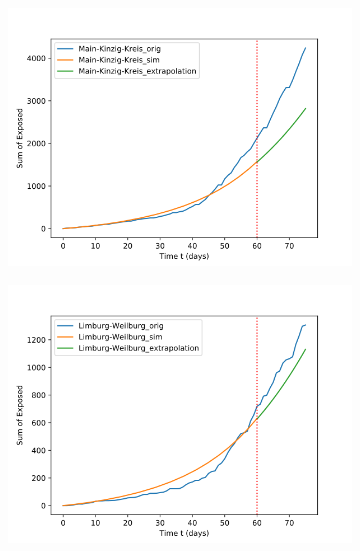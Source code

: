 \begin{figure}[h]
\begin{subfigure}[b]{0.3\textwidth}
		\includegraphics[width=\textwidth]{./figures/60d/13_Main-Kinzig-Kreis.png}	
		\caption{}
	\end{subfigure}
	\hfill
	\begin{subfigure}[b]{0.3\textwidth}
		\centering
		\includegraphics[width=\textwidth]{./figures/60d/10_Limburg-Weilburg.png}	
		\caption{}
	\end{subfigure}
	\begin{subfigure}[b]{0.3\textwidth}
		\centering

\end{subfigure}
\end{figure}
